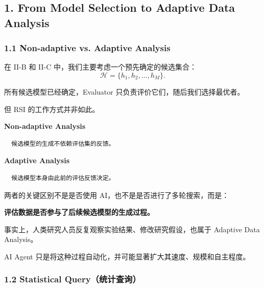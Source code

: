 \hypertarget{part-2-20-0001-from-model-selection-to-adaptive-data-analysis}{%
\subsection{1. From Model Selection to Adaptive Data Analysis}\label{part-2-20-0001-from-model-selection-to-adaptive-data-analysis}}

\hypertarget{part-2-20-0001-non-adaptive-vs.-adaptive-analysis}{%
\subsubsection{1.1 Non-adaptive vs. Adaptive Analysis}\label{part-2-20-0001-non-adaptive-vs.-adaptive-analysis}}

在 II-B 和 II-C 中，我们主要考虑一个预先确定的候选集合：
\[\mathcal H=\{h_1,h_2,\ldots,h_M\}.\]

所有候选模型已经确定，Evaluator 只负责评价它们，随后我们选择最优者。

但 RSI 的工作方式并非如此。

\textbf{Non-adaptive Analysis}


\begin{verbatim}
  候选模型的生成不依赖评估集的反馈。
\end{verbatim}

\textbf{Adaptive Analysis}


\begin{verbatim}
  候选模型本身由此前的评估反馈决定。
\end{verbatim}

两者的关键区别不是是否使用 AI，也不是是否进行了多轮搜索，而是：

\textbf{评估数据是否参与了后续候选模型的生成过程。}

事实上，人类研究人员反复观察实验结果、修改研究假设，也属于 Adaptive Data Analysis。

AI Agent 只是将这种过程自动化，并可能显著扩大其速度、规模和自主程度。

\hypertarget{part-2-20-0001-statistical-queryux7edfux8ba1ux67e5ux8be2}{%
\subsubsection{1.2 Statistical Query（统计查询）}\label{part-2-20-0001-statistical-queryux7edfux8ba1ux67e5ux8be2}}

